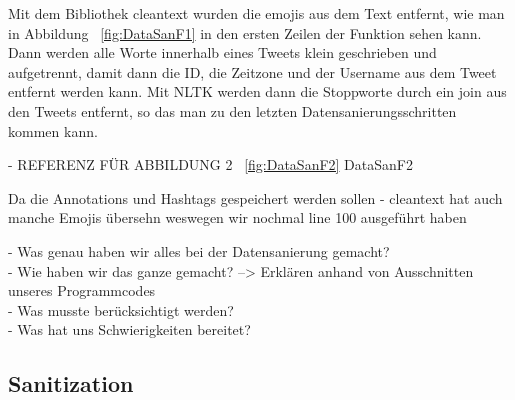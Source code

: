 
	Mit dem Bibliothek cleantext wurden die emojis aus dem Text entfernt, wie man in Abbildung ~\ref{fig:DataSanF1} in den ersten Zeilen der Funktion sehen kann.
	Dann werden alle Worte innerhalb eines Tweets klein geschrieben und aufgetrennt, damit dann  die ID, die Zeitzone und der Username aus dem Tweet entfernt 
	werden kann. Mit NLTK werden dann die Stoppworte durch ein join aus den Tweets entfernt, so das man zu den letzten Datensanierungsschritten kommen kann.
	 

- REFERENZ FÜR ABBILDUNG 2 ~\ref{fig:DataSanF2} DataSanF2

	Da die Annotations und Hashtags gespeichert werden sollen
	- cleantext hat auch manche Emojis übersehn weswegen wir nochmal line 100 ausgeführt haben	
	
	- Was genau haben wir alles bei der Datensanierung gemacht?\\
	- Wie haben wir das ganze gemacht? --> Erklären anhand von Ausschnitten unseres Programmcodes\\
	
	- Was musste berücksichtigt werden?\\
	- Was hat uns Schwierigkeiten bereitet?	
	
	
	\subsection{Sanitization}
	

	
	
	
